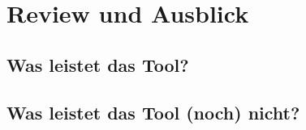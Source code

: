 \chapter{Review und Ausblick}
\section{Was leistet das Tool?}

\section{Was leistet das Tool (noch) nicht?}






